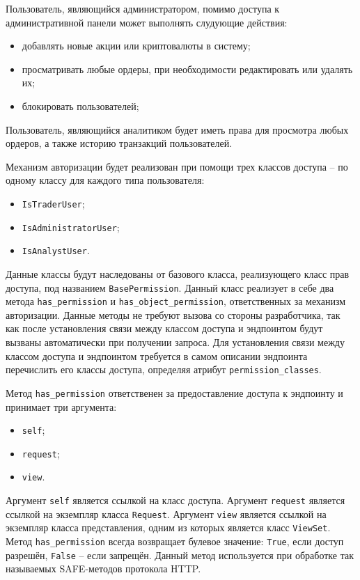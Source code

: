 Пользователь, являющийся администратором, помимо доступа к административной панели может выполнять слудующие действия:
\begin{itemize}
    \item добавлять новые акции или криптовалюты в систему;
    \item просматривать любые ордеры, при необходимости редактировать или удалять их;
    \item блокировать пользователей;
\end{itemize}

Пользователь, являющийся аналитиком будет иметь права для просмотра любых ордеров, а также историю транзакций пользователей.

Механизм авторизации будет реализован при помощи трех классов доступа -- по одному классу для каждого типа пользователя:
\begin{itemize}
    \item \lstinline{IsTraderUser};
    \item \lstinline{IsAdministratorUser};
    \item \lstinline{IsAnalystUser}.
\end{itemize}

Данные классы будут наследованы от базового класса, реализующего класс прав доступа, под названием \lstinline{BasePermission}.
Данный класс реализует в себе два метода \lstinline{has_permission} и \lstinline{has_object_permission}, ответственных за механизм авторизации.
Данные методы не требуют вызова со стороны разработчика, так как после установления связи между классом доступа и эндпоинтом будут вызваны автоматически при получении запроса.
Для установления связи между классом доступа и эндпоинтом требуется в самом описании эндпоинта перечислить его классы доступа, определяя атрибут \lstinline{permission_classes}.

Метод \lstinline{has_permission} ответственен за предоставление доступа к эндпоинту и принимает три аргумента:
\begin{itemize}
    \item \lstinline{self};
    \item \lstinline{request};
    \item \lstinline{view}.
\end{itemize}
Аргумент \lstinline{self} является ссылкой на класс доступа.
Аргумент \lstinline{request} является ссылкой на экземпляр класса \lstinline{Request}.
Аргумент \lstinline{view} является ссылкой на экземпляр класса представления, одним из которых является класс \lstinline{ViewSet}.
Метод \lstinline{has_permission} всегда возвращает булевое значение: \lstinline{True}, если доступ разрешён, \lstinline{False} -- если запрещён.
Данный метод используется при обработке так называемых SAFE-методов протокола HTTP.

